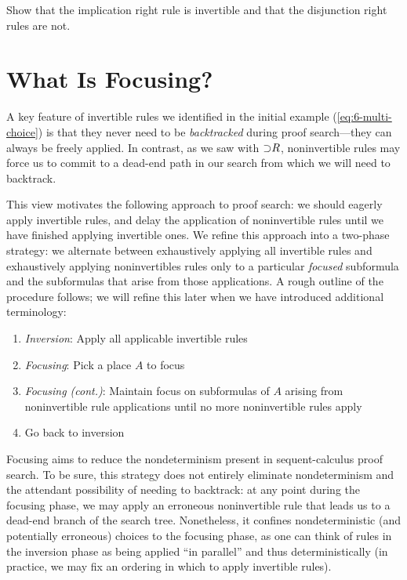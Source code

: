\documentclass{article}
\begin{document}
\begin{exercise}
Show that the implication right rule is invertible and that the disjunction right rules are not.
\end{exercise}

\section{What Is Focusing?}

A key feature of invertible rules we identified in the initial example (\ref{eq:6-multi-choice}) is
that they never need to be \emph{backtracked} during proof search---they can always be freely
applied. In contrast, as we saw with ${\supset} R$, noninvertible rules may force us to commit to a
dead-end path in our search from which we will need to backtrack.

This view motivates the following approach to proof search: we should eagerly apply invertible
rules, and delay the application of noninvertible rules until we have finished applying invertible
ones. We refine this approach into a two-phase strategy: we alternate between exhaustively applying
all invertible rules and exhaustively applying noninvertibles rules only to a particular
\emph{focused} subformula and the subformulas that arise from those applications. A rough outline
of the procedure follows; we will refine this later when we have introduced additional terminology:

\begin{enumerate}
  \item \emph{Inversion}: Apply all applicable invertible rules
  \item \emph{Focusing}: Pick a place $A$ to focus
  \item \emph{Focusing (cont.)}: Maintain focus on subformulas of $A$ arising from noninvertible
  rule applications until no more noninvertible rules apply
  \item Go back to inversion
\end{enumerate}

Focusing aims to reduce the nondeterminism present in sequent-calculus proof search. To be sure,
this strategy does not entirely eliminate nondeterminism and the attendant possibility of needing to
backtrack: at any point during the focusing phase, we may apply an erroneous noninvertible rule that
leads us to a dead-end branch of the search tree. Nonetheless, it confines nondeterministic (and
potentially erroneous) choices to the focusing phase, as one can think of rules in the inversion
phase as being applied ``in parallel'' and thus deterministically (in practice, we may fix an
ordering in which to apply invertible rules).
\end{document}
